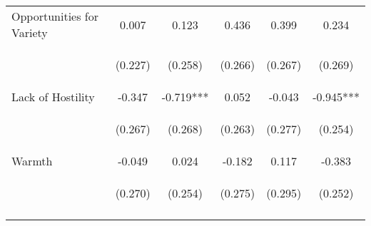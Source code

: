 \begin{tabular}{lccccc}
\noalign{\smallskip}Opportunities for Variety & 0.007 & 0.123 & 0.436 & 0.399 & 0.234\\
 & \begin{footnotesize}(0.227)\end{footnotesize} & \begin{footnotesize}(0.258)\end{footnotesize} & \begin{footnotesize}(0.266)\end{footnotesize} & \begin{footnotesize}(0.267)\end{footnotesize} & \begin{footnotesize}(0.269)\end{footnotesize}\\
\noalign{\smallskip}Lack of Hostility & -0.347 & -0.719*** & 0.052 & -0.043 & -0.945***\\
 & \begin{footnotesize}(0.267)\end{footnotesize} & \begin{footnotesize}(0.268)\end{footnotesize} & \begin{footnotesize}(0.263)\end{footnotesize} & \begin{footnotesize}(0.277)\end{footnotesize} & \begin{footnotesize}(0.254)\end{footnotesize}\\
\noalign{\smallskip}Warmth & -0.049 & 0.024 & -0.182 & 0.117 & -0.383\\
 & \begin{footnotesize}(0.270)\end{footnotesize} & \begin{footnotesize}(0.254)\end{footnotesize} & \begin{footnotesize}(0.275)\end{footnotesize} & \begin{footnotesize}(0.295)\end{footnotesize} & \begin{footnotesize}(0.252)\end{footnotesize}\\
\noalign{\smallskip}\hline\end{tabular}\\
